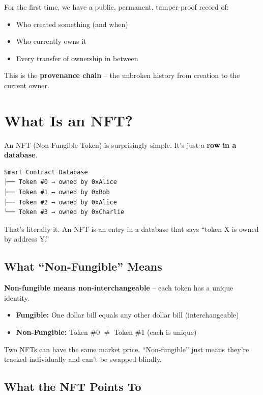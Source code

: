\documentclass[11pt,a4paper]{article}
\newcommand{\keyword}[1]{\textbf{\textcolor{accentcolor}{#1}}}
\begin{document}
For the first time, we have a public, permanent, tamper-proof record of:
\begin{itemize}
    \item Who created something (and when)
    \item Who currently owns it
    \item Every transfer of ownership in between
\end{itemize}

This is the \keyword{provenance chain} -- the unbroken history from creation to the current owner.

\newpage
\section{What Is an NFT?}

An NFT (Non-Fungible Token) is surprisingly simple. It's just a \keyword{row in a database}.

\begin{mdframed}[style=codeblock]
\begin{verbatim}
Smart Contract Database
├── Token #0 → owned by 0xAlice
├── Token #1 → owned by 0xBob
├── Token #2 → owned by 0xAlice
└── Token #3 → owned by 0xCharlie
\end{verbatim}
\end{mdframed}

That's literally it. An NFT is an entry in a database that says ``token X is owned by address Y.''

\subsection{What ``Non-Fungible'' Means}

\textbf{Non-fungible means non-interchangeable} -- each token has a unique identity.

\begin{itemize}
    \item \textbf{Fungible:} One dollar bill equals any other dollar bill (interchangeable)
    \item \textbf{Non-Fungible:} Token \#0 $\neq$ Token \#1 (each is unique)
\end{itemize}

Two NFTs can have the same market price. ``Non-fungible'' just means they're tracked individually and can't be swapped blindly.

\subsection{What the NFT Points To}
\end{document}
